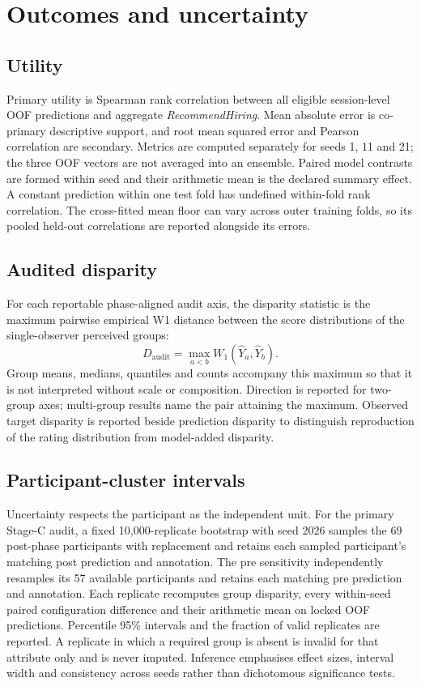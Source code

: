 \section{Outcomes and uncertainty}

\subsection{Utility}

Primary utility is Spearman rank correlation between all eligible session-level OOF predictions
and aggregate \emph{RecommendHiring}. Mean absolute error is co-primary descriptive support, and
root mean squared error and Pearson correlation are secondary. Metrics are computed separately
for seeds 1, 11 and 21;
the three OOF vectors are not averaged into an ensemble. Paired model contrasts are formed within
seed and their arithmetic mean is the declared summary effect. A constant prediction within one
test fold has undefined within-fold rank correlation. The cross-fitted mean floor can vary across
outer training folds, so its pooled held-out correlations are reported alongside its errors.

\subsection{Audited disparity}

For each reportable phase-aligned audit axis, the disparity statistic is the maximum pairwise
empirical W1 distance between the score distributions of the single-observer perceived groups:
\begin{equation}
    D_{\mathrm{audit}}=\max_{a<b}W_1(\hat Y_a,\hat Y_b).
\end{equation}
Group means, medians, quantiles and counts accompany this maximum so that it is not interpreted
without scale or composition. Direction is reported for two-group axes; multi-group results name
the pair attaining the maximum. Observed target disparity is reported beside prediction disparity
to distinguish reproduction of the rating distribution from model-added disparity.

\subsection{Participant-cluster intervals}

Uncertainty respects the participant as the independent unit. For the primary Stage-C audit, a
fixed 10,000-replicate bootstrap with seed 2026 samples the 69 post-phase participants with
replacement and retains each sampled participant's matching post prediction and annotation. The
pre sensitivity independently resamples its 57 available participants and retains each matching
pre prediction and annotation. Each replicate recomputes group disparity, every within-seed paired
configuration difference and their arithmetic mean on locked OOF predictions. Percentile 95\%
intervals and the fraction of valid replicates are reported. A replicate in which a required group
is absent is invalid for that attribute only and is never imputed. Inference emphasises effect
sizes, interval width and consistency across seeds rather than dichotomous significance tests.

